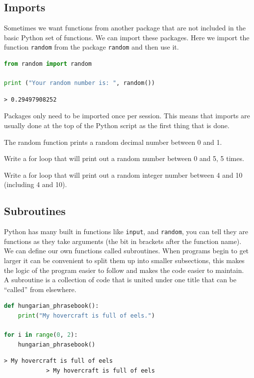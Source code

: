 	\subsection{Imports}
		Sometimes we want functions from another package that are not included in the basic Python set of functions. We can import these packages. Here we import the function \texttt{random} from the package \texttt{random} and then use it.
		\begin{lstlisting}[language=Python]
from random import random

print ("Your random number is: ", random())\end{lstlisting}
		\begin{verbatim}> 0.29497908252\end{verbatim}
		Packages only need to be imported once per session. This means that imports are usually done at the top of the Python script as the first thing that is done.
		
		The random function prints a random decimal number between 0 and 1.
		\begin{task}Write a for loop that will print out a random number between 0 and 5, 5 times.\end{task}
		\begin{task}Write a for loop that will print out a random integer number between 4 and 10 (including 4 and 10).\end{task}		

	\subsection{Subroutines}
			Python has many built in functions like \texttt{input}, and \texttt{random}, you can tell they are functions as they take arguments (the bit in brackets after the function name). We can define our own functions called subroutines. When programs begin to get larger it can be convenient to split them up into smaller subsections, this makes the logic of the program easier to follow and makes the code easier to maintain. A subroutine is a collection of code that is united under one title that can be ``called'' from elsewhere. 
			\begin{lstlisting}[language=Python]
def hungarian_phrasebook():
	print("My hovercraft is full of eels.")

for i in range(0, 2):
	hungarian_phrasebook()\end{lstlisting}
			\begin{verbatim}> My hovercraft is full of eels
			> My hovercraft is full of eels
			\end{verbatim}

